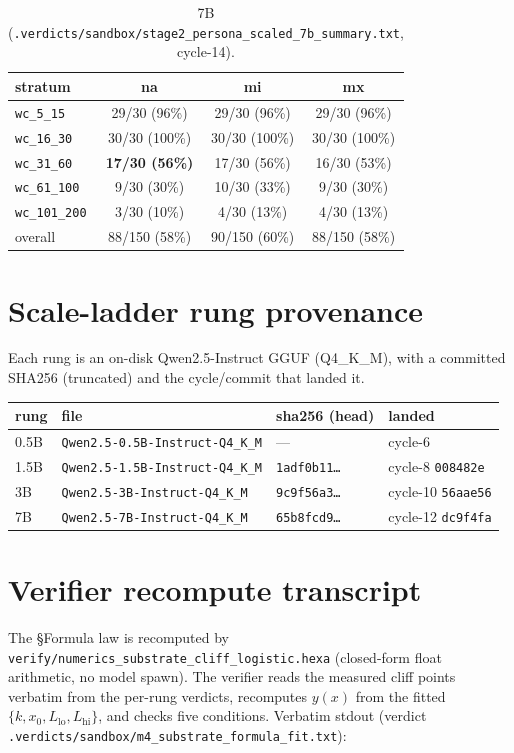 \documentclass[11pt,a4paper]{article}
\newcommand{\vfile}[1]{\texttt{.verdicts/sandbox/#1}}
\begin{document}
\begin{table}[h]
\centering
\caption{7B (\vfile{stage2\_persona\_scaled\_7b\_summary.txt}, cycle-14).}
\begin{tabular}{lccc}
\toprule
stratum & na & mi & mx \\
\midrule
\texttt{wc\_5\_15}    & 29/30 (96\%) & 29/30 (96\%)  & 29/30 (96\%) \\
\texttt{wc\_16\_30}   & 30/30 (100\%)& 30/30 (100\%) & 30/30 (100\%) \\
\texttt{wc\_31\_60}   & \textbf{17/30 (56\%)} & 17/30 (56\%) & 16/30 (53\%) \\
\texttt{wc\_61\_100}  & 9/30 (30\%)  & 10/30 (33\%)  & 9/30 (30\%) \\
\texttt{wc\_101\_200} & 3/30 (10\%)  & 4/30 (13\%)   & 4/30 (13\%) \\
\midrule
overall & 88/150 (58\%) & 90/150 (60\%) & 88/150 (58\%) \\
\bottomrule
\end{tabular}
\end{table}

\section{Scale-ladder rung provenance}
\label{app:rungs}
Each rung is an on-disk Qwen2.5-Instruct GGUF (Q4\_K\_M), with a committed
SHA256 (truncated) and the cycle/commit that landed it.

\begin{center}
\begin{tabular}{llll}
\toprule
rung & file & sha256 (head) & landed \\
\midrule
0.5B & \texttt{Qwen2.5-0.5B-Instruct-Q4\_K\_M} & --- & cycle-6 \\
1.5B & \texttt{Qwen2.5-1.5B-Instruct-Q4\_K\_M} & \texttt{1adf0b11\dots} & cycle-8 \texttt{008482e} \\
3B   & \texttt{Qwen2.5-3B-Instruct-Q4\_K\_M}   & \texttt{9c9f56a3\dots} & cycle-10 \texttt{56aae56} \\
7B   & \texttt{Qwen2.5-7B-Instruct-Q4\_K\_M}   & \texttt{65b8fcd9\dots} & cycle-12 \texttt{dc9f4fa} \\
\bottomrule
\end{tabular}
\end{center}

\section{Verifier recompute transcript}
\label{app:recompute}
The §Formula law is recomputed by
\texttt{verify/numerics\_substrate\_cliff\_logistic.hexa} (closed-form float
arithmetic, no model spawn). The verifier reads the measured cliff points
verbatim from the per-rung verdicts, recomputes \(y(x)\) from the fitted
\(\{k,x_0,L_{\mathrm{lo}},L_{\mathrm{hi}}\}\), and checks five conditions.
Verbatim stdout (verdict \vfile{m4\_substrate\_formula\_fit.txt}):
\end{document}
